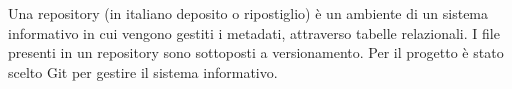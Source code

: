 

{Una repository (in italiano deposito o ripostiglio) è un ambiente di un sistema informativo in cui vengono gestiti i metadati, attraverso tabelle relazionali. I file presenti in un repository sono sottoposti a versionamento. Per il progetto è stato scelto Git per gestire il sistema informativo.}

